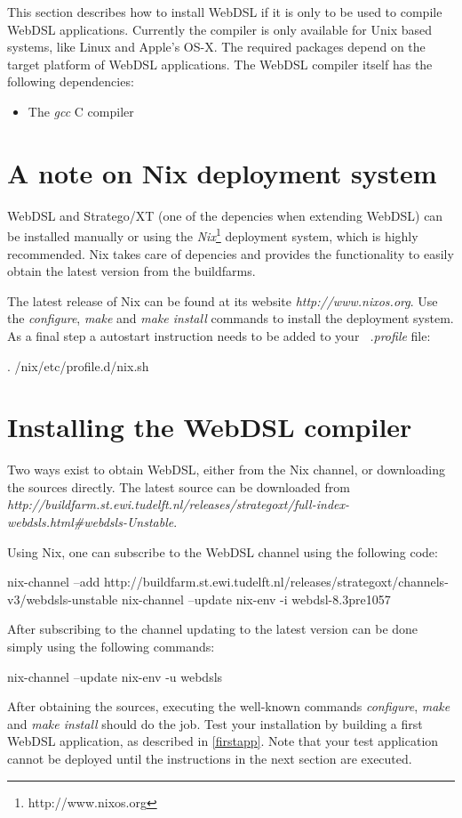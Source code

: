 This section describes how to install WebDSL if it is only to be used to compile WebDSL applications. Currently the compiler is only available for Unix based systems, like Linux and Apple's OS-X. The required packages depend on the target platform of WebDSL applications. The WebDSL compiler itself has the following dependencies:
\begin{itemize}
	\item The \emph{gcc} C compiler
\end{itemize}

\section{A note on Nix deployment system}\label{installnix}
WebDSL and Stratego/XT (one of the depencies when extending WebDSL) can be installed manually or using the \emph{Nix}\footnote{http://www.nixos.org} deployment system, which is highly recommended. Nix takes care of depencies and provides the functionality to easily obtain the latest version from the buildfarms.

The latest release of Nix can be found at its website \emph{http://www.nixos.org}. Use the \emph{configure}, \emph{make} and \emph{make install} commands to install the deployment system. %
As a final step a autostart instruction needs to be added to your \emph{~.profile} file:
\begin{shell}
. /nix/etc/profile.d/nix.sh
\end{shell}

\section{Installing the WebDSL compiler}\label{retreivewebdsl}
Two ways exist to obtain WebDSL, either from the Nix channel, or downloading the sources directly. The latest source can be downloaded from \emph{http://buildfarm.st.ewi.tudelft.nl/releases/strategoxt/full-index-webdsls.html\#webdsls-Unstable}.

Using Nix, one can subscribe to the WebDSL channel using the following code: 
\begin{shell}
nix-channel --add http://buildfarm.st.ewi.tudelft.nl/releases/strategoxt/channels-v3/webdsls-unstable
nix-channel --update
nix-env -i webdsl-8.3pre1057
\end{shell}
After subscribing to the channel updating to the latest version can be done simply using the following commands:
\begin{shell}
nix-channel --update
nix-env -u webdsls
\end{shell}
After obtaining the sources, executing the well-known commands \emph{configure}, \emph{make} and \emph{make install} should do the job. Test your installation by building a first WebDSL application, as described in \ref{firstapp}. Note that your test application cannot be deployed until the instructions in the next section are executed. 

